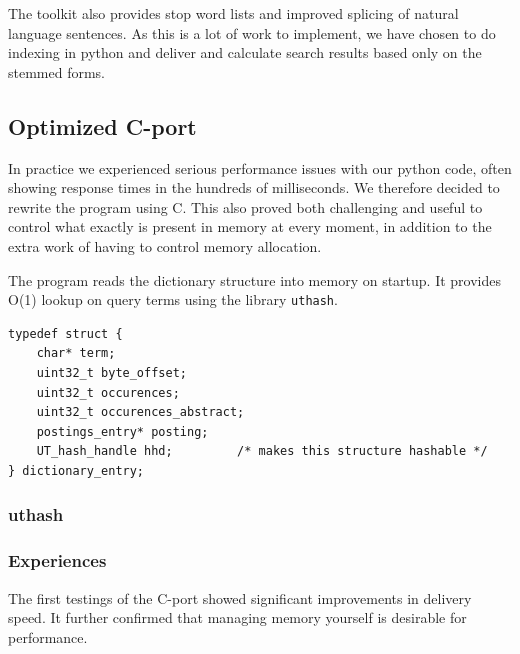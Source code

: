 The toolkit also provides stop word lists and improved splicing of natural language sentences. As this is a lot of work to implement, we have chosen to do indexing in python and deliver and calculate search results based only on the stemmed forms.

\subsection{Optimized C-port}
In practice we experienced serious performance issues with our python code, often showing response times in the hundreds of milliseconds. We therefore decided to rewrite the program using C. This also proved both challenging and useful to control what exactly is present in memory at every moment, in addition to the extra work of having to control memory allocation.

The program reads the dictionary structure into memory on startup. It provides O(1) lookup on query terms using the library {\tt uthash}.

\begin{lstlisting}[style=customc,caption={Structure of a dictionary entry (term)}]
typedef struct {
    char* term;
    uint32_t byte_offset;
    uint32_t occurences;
    uint32_t occurences_abstract;
    postings_entry* posting;
    UT_hash_handle hhd;         /* makes this structure hashable */
} dictionary_entry;
\end{lstlisting}
\subsubsection{uthash}
\subsubsection{Experiences}
The first testings of the C-port showed significant improvements in delivery speed. It further confirmed that managing memory yourself is desirable for performance.

